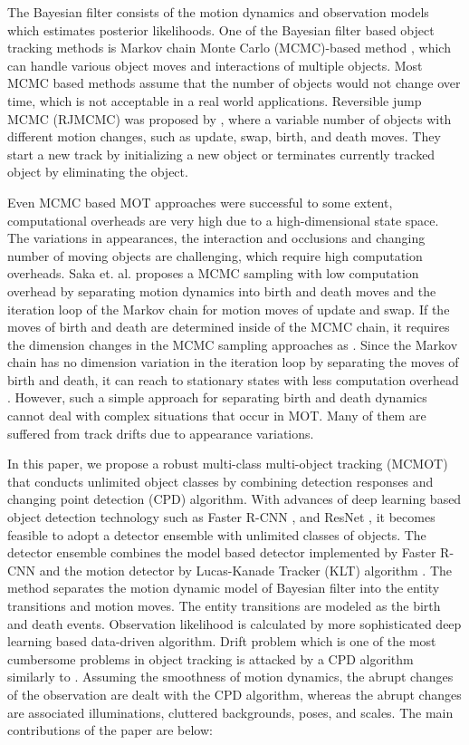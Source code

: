 \documentclass[runningheads]{llncs}
\begin{document}
The Bayesian filter consists of the motion dynamics and observation models which estimates posterior likelihoods. One of the Bayesian filter based object tracking methods is Markov chain Monte Carlo (MCMC)-based method \cite{Ref2,Ref3,Ref4,Ref5}, which can handle various object moves and interactions of multiple objects. Most MCMC based methods assume that the number of objects would not change over time, which is not acceptable in a real world applications. Reversible jump MCMC (RJMCMC) was proposed by \cite{Ref2,Ref4}, where a variable number of objects with different motion changes, such as update, swap, birth, and death moves. They start a new track by initializing a new object or terminates currently tracked object by eliminating the object.

Even MCMC based MOT approaches were successful to some extent, computational overheads are very high due to a high-dimensional state space. The variations in appearances, the interaction and occlusions and changing number of moving objects are challenging, which require high computation overheads. Saka et. al. \cite{Ref1} proposes a MCMC sampling with low computation overhead by separating motion dynamics into birth and death moves and the iteration loop of the Markov chain for motion moves of update and swap. If the moves of birth and death are determined inside of the MCMC chain, it requires the dimension changes in the MCMC sampling approaches as \cite{Ref2,Ref3}. Since the Markov chain has no dimension variation in the iteration loop by separating the moves of birth and death, it can reach to stationary states with less computation overhead \cite{Ref1,Ref6}. However, such a simple approach for separating birth and death dynamics cannot deal with complex situations that occur in MOT. Many of them are suffered from track drifts due to appearance variations.

In this paper, we propose a robust multi-class multi-object tracking (MCMOT) that conducts unlimited object classes by combining detection responses and changing  point detection (CPD) algorithm. With advances of deep learning based object detection technology such as Faster R-CNN \cite{Ref28}, and ResNet \cite{Ref29}, it becomes feasible to adopt a detector ensemble with unlimited classes of objects. The detector ensemble combines the model based detector implemented by Faster R-CNN \cite{Ref28} and the motion detector by Lucas-Kanade Tracker (KLT) algorithm \cite{Ref26}. The method separates the motion dynamic model of Bayesian filter into the entity transitions and motion moves. The entity transitions are modeled as the birth and death events. Observation likelihood is calculated by more sophisticated deep learning based data-driven algorithm. Drift problem which is one of the most cumbersome problems in object tracking is attacked by a CPD algorithm similarly to \cite{Ref24}. Assuming the smoothness of motion dynamics, the abrupt changes of the observation are dealt with the CPD algorithm, whereas the abrupt changes are associated illuminations, cluttered backgrounds, poses, and scales. The main contributions of the paper are below:
\end{document}
